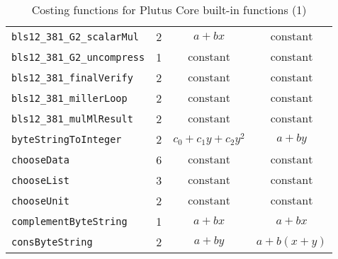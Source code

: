 \documentclass[a4paper]{article}
\newcommand\const{\ensuremath{\text{constant}}}
\newcommand\linX{\ensuremath{a+bx}}
\newcommand\linY{\ensuremath{a+by}}
\newcommand\linplusXY{\ensuremath{a+b(x+y)}}
\newcommand\quadr[1]{\ensuremath{c_{0} + c_{1}{#1} + c_{2}{#1}^2}}
\begin{document}
\begin{table}[H]
\begin{tabular}{|l|c|c|c|}
        \verb|bls12_381_G2_scalarMul|          & 2 & \linX & \const \\
        \verb|bls12_381_G2_uncompress|         & 1 & \const & \const \\
        \verb|bls12_381_finalVerify|           & 2 & \const & \const \\
        \verb|bls12_381_millerLoop|            & 2 & \const & \const \\
        \verb|bls12_381_mulMlResult|           & 2 & \const & \const \\
        \verb|byteStringToInteger|             & 2 & \quadr{y} & \linY \\
        \verb|chooseData|                      & 6 & \const & \const \\
        \verb|chooseList|                      & 3 & \const & \const \\
        \verb|chooseUnit|                      & 2 & \const & \const \\
        \verb|complementByteString|            & 1 & \linX & \linX \\
        \verb|consByteString|                  & 2 & \linY & \linplusXY \\
        \hline
    \end{tabular}
    \caption{Costing functions for Plutus Core built-in functions (1)}
    \label{table:costing-functions-1}
\end{table}
\end{document}
